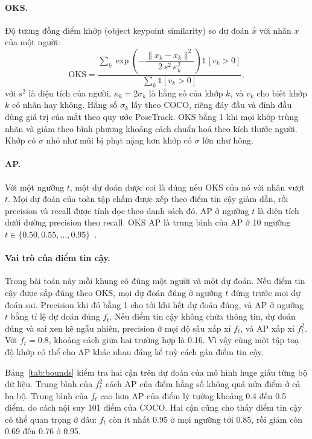 \documentclass[11pt,a4paper]{article}
\newcommand{\OKS}{\mathrm{OKS}}
\begin{document}
\paragraph{OKS.} Độ tương đồng điểm khớp (object keypoint similarity) so dự đoán $\hat x$ với nhãn $x$ của một người:
\begin{equation}
\OKS=\frac{\sum_{k}\exp\!\left(-\dfrac{\|\hat x_k-x_k\|^2}{2\,s^2\,\kappa_k^2}\right)\mathbb{1}[v_k>0]}{\sum_k\mathbb{1}[v_k>0]},
\end{equation}
với $s^2$ là diện tích của người, $\kappa_k=2\sigma_k$ là hằng số của khớp $k$, và $v_k$ cho biết khớp $k$ có nhãn hay không. Hằng số $\sigma_k$ lấy theo COCO, riêng đáy đầu và đỉnh đầu dùng giá trị của mắt theo quy ước PoseTrack. OKS bằng 1 khi mọi khớp trùng nhãn và giảm theo bình phương khoảng cách chuẩn hoá theo kích thước người. Khớp có $\sigma$ nhỏ như mũi bị phạt nặng hơn khớp có $\sigma$ lớn như hông.

\paragraph{AP.} Với một ngưỡng $t$, một dự đoán được coi là đúng nếu OKS của nó với nhãn vượt $t$. Mọi dự đoán của toàn tập chấm được xếp theo điểm tin cậy giảm dần, rồi precision và recall được tính dọc theo danh sách đó. AP ở ngưỡng $t$ là diện tích dưới đường precision theo recall. OKS AP là trung bình của AP ở 10 ngưỡng $t\in\{0.50,0.55,\dots,0.95\}$~\cite{coco}.

\paragraph{Vai trò của điểm tin cậy.} Trong bài toán này mỗi khung có đúng một người và một dự đoán. Nếu điểm tin cậy được sắp đúng theo OKS, mọi dự đoán đúng ở ngưỡng $t$ đứng trước mọi dự đoán sai. Precision khi đó bằng 1 cho tới khi hết dự đoán đúng, và AP ở ngưỡng $t$ bằng tỉ lệ dự đoán đúng $f_t$. Nếu điểm tin cậy không chứa thông tin, dự đoán đúng và sai xen kẽ ngẫu nhiên, precision ở mọi độ sâu xấp xỉ $f_t$, và AP xấp xỉ $f_t^2$. Với $f_t=0.8$, khoảng cách giữa hai trường hợp là 0.16. Vì vậy cùng một tập toạ độ khớp có thể cho AP khác nhau đáng kể tuỳ cách gán điểm tin cậy.

Bảng~\ref{tab:bounds} kiểm tra hai cận trên dự đoán của mô hình huge giấu từng bộ dữ liệu. Trung bình của $f_t^2$ cách AP của điểm hằng số không quá nửa điểm ở cả ba bộ. Trung bình của $f_t$ cao hơn AP của điểm lý tưởng khoảng 0.4 đến 0.5 điểm, do cách nội suy 101 điểm của COCO. Hai cận cũng cho thấy điểm tin cậy có thể quan trọng ở đâu: $f_t$ còn ít nhất 0.95 ở mọi ngưỡng tới 0.85, rồi giảm còn 0.69 đến 0.76 ở 0.95.
\end{document}
